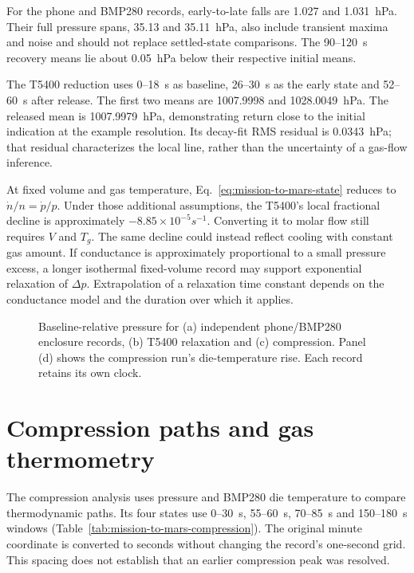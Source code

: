 For the phone and BMP280 records, early-to-late falls are 1.027 and 1.031~hPa. Their full pressure spans, 35.13 and 35.11~hPa, also include transient maxima and noise and should not replace settled-state comparisons. The 90--120~s recovery means lie about 0.05~hPa below their respective initial means.

The T5400 reduction uses 0--18~s as baseline, 26--30~s as the early state and 52--60~s after release. The first two means are 1007.9998 and 1028.0049~hPa. The released mean is 1007.9979~hPa, demonstrating return close to the initial indication at the example resolution. Its decay-fit RMS residual is 0.0343~hPa; that residual characterizes the local line, rather than the uncertainty of a gas-flow inference.

At fixed volume and gas temperature, Eq.~\eqref{eq:mission-to-mars-state} reduces to $\dot n/n=\dot p/p$. Under those additional assumptions, the T5400's local fractional decline is approximately $-8.85\times10^{-5}\unit{s^{-1}}$. Converting it to molar flow still requires $V$ and $T_g$. The same decline could instead reflect cooling with constant gas amount. If conductance is approximately proportional to a small pressure excess, a longer isothermal fixed-volume record may support exponential relaxation of $\Delta p$. Extrapolation of a relaxation time constant depends on the conductance model and the duration over which it applies.

\begin{figure}[t]
\centering

\caption{Baseline-relative pressure for (a) independent phone/BMP280 enclosure records, (b) T5400 relaxation and (c) compression. Panel (d) shows the compression run's die-temperature rise. Each record retains its own clock.}
\label{fig:mission-to-mars-data}
\end{figure}

\section{Compression paths and gas thermometry}
The compression analysis uses pressure and BMP280 die temperature to compare thermodynamic paths. Its four states use 0--30~s, 55--60~s, 70--85~s and 150--180~s windows (Table~\ref{tab:mission-to-mars-compression}). The original minute coordinate is converted to seconds without changing the record's one-second grid. This spacing does not establish that an earlier compression peak was resolved.

